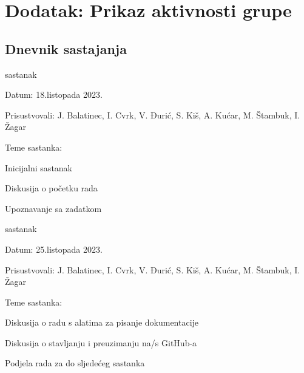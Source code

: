 \chapter*{Dodatak: Prikaz aktivnosti grupe}
		
		\section*{Dnevnik sastajanja}
		
		
		
		\begin{packed_enum}
			
			\item  sastanak
			
			\item[] \begin{packed_item}
				\item Datum: 18.listopada 2023.
				\item Prisustvovali: J. Balatinec, I. Cvrk, V. Đurić, S. Kiš, A. Kućar, M. Štambuk, I. Žagar
				\item Teme sastanka:
				\begin{packed_item}
					\item  Inicijalni sastanak
					\item  Diskusija o početku rada
					\item  Upoznavanje sa zadatkom
				\end{packed_item}
			\end{packed_item}
			
			\item  sastanak
			
			\item[] \begin{packed_item}
				\item Datum: 25.listopada 2023.
				\item Prisustvovali: J. Balatinec, I. Cvrk, V. Đurić, S. Kiš, A. Kućar, M. Štambuk, I. Žagar
				\item Teme sastanka:
				\begin{packed_item}
					\item  Diskusija o radu s alatima za pisanje dokumentacije
					\item  Diskusija o stavljanju i preuzimanju na/s GitHub-a
					\item  Podjela rada za do sljedećeg sastanka
				\end{packed_item}
			\end{packed_item}
			

\end{packed_enum}
